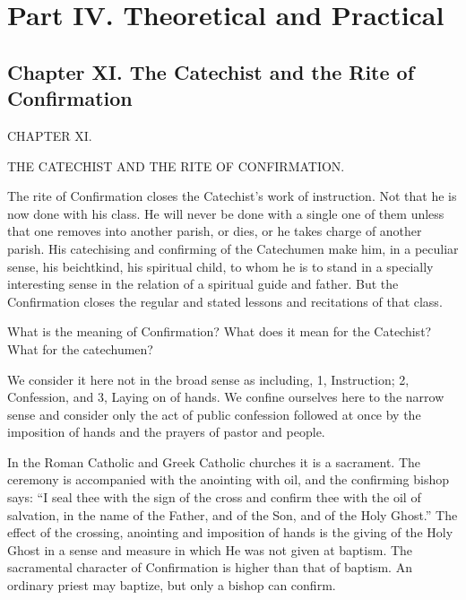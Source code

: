 \part{Part IV. Theoretical and Practical}

\chapter[Chapter XI. The Rite of Confirmation]{Chapter XI. The Catechist and the Rite of Confirmation}

CHAPTER XI.

THE CATECHIST AND THE RITE OF CONFIRMATION.

The rite of Confirmation closes the Catechist’s work of instruction. Not that he is now done with his class. He will never be done with a single one of them unless that one removes into another parish, or dies, or he takes charge of another parish. His catechising and confirming of the Catechumen make him, in a peculiar sense, his beichtkind, his spiritual child, to whom he is to stand in a specially interesting sense in the relation of a spiritual guide and father. But the Confirmation closes the regular and stated lessons and recitations of that class.

What is the meaning of Confirmation? What does it mean for the Catechist? What for the catechumen? 

We consider it here not in the broad sense as including, 1, Instruction; 2, Confession, and 3, Laying on of hands. We confine ourselves here to the narrow sense and consider only the act of public confession followed at once by the imposition of hands and the prayers of pastor and people.

In the Roman Catholic and Greek Catholic churches it is a sacrament. The ceremony is accompanied with the anointing with oil, and the confirming
bishop says: “I seal thee with the sign of the cross and confirm thee with the oil of salvation, in the name of the Father, and of the Son, and of the Holy Ghost.” The effect of the crossing, anointing and imposition of hands is the giving of the Holy Ghost in a sense and measure in which He was not given at baptism. The sacramental character of Confirmation is higher than that of baptism. An ordinary priest may baptize, but only a bishop can confirm.


